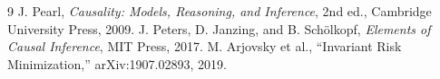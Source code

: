 \documentclass[10pt,twocolumn]{article}
\begin{document}
\begin{thebibliography}{9}
J. Pearl, \emph{Causality: Models, Reasoning, and Inference}, 2nd ed., Cambridge University Press, 2009.
J. Peters, D. Janzing, and B. Sch\"olkopf, \emph{Elements of Causal Inference}, MIT Press, 2017.
M. Arjovsky et al., ``Invariant Risk Minimization,'' arXiv:1907.02893, 2019.
\end{thebibliography}
\end{document}
